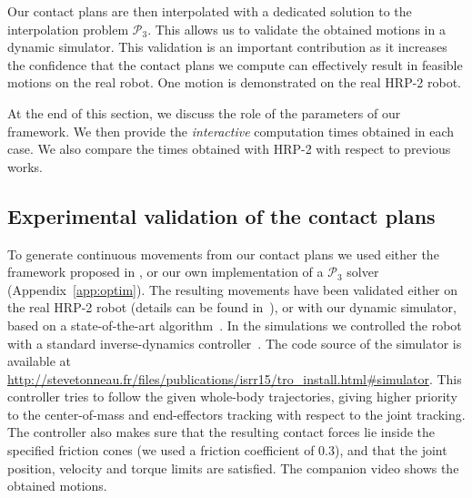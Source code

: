 \documentclass[journal]{IEEEtran}
\begin{document}
Our contact plans are then interpolated with a dedicated solution to the interpolation problem $\mathcal{P}_3$. This allows us to validate the obtained
motions in a dynamic simulator. This validation is an important contribution as it increases the confidence that the contact plans we compute can effectively
result in feasible motions on the real robot. One motion is demonstrated on the real HRP-2 robot.

At the end of this section, we discuss the role of the parameters of our framework. We then provide the \textit{interactive} computation times obtained in each case.
We also compare the times obtained with HRP-2 with respect to previous works.

\subsection{Experimental validation of the contact plans} \label{sec:valid}
To generate continuous movements from our contact plans we used either the framework proposed in \cite{Carpentier2016}, or our own implementation of a $\mathcal{P}_3$ solver (Appendix~\ref{app:optim}).
The resulting movements have been validated either on the real HRP-2 robot (details can be found in~\cite{Carpentier2016}), or with our dynamic simulator, based on a state-of-the-art algorithm~\cite{Kaufman2008}.
In the simulations we controlled the robot with a standard inverse-dynamics controller~\cite{DelPrete2015b}. The code source of the simulator is available at \url{http://stevetonneau.fr/files/publications/isrr15/tro_install.html\#simulator}.
This controller tries to follow the given whole-body trajectories, giving higher priority to the center-of-mass and end-effectors tracking with respect to the joint tracking.
The controller also makes sure that the resulting contact forces lie inside the specified friction cones (we used a friction coefficient of 0.3), and that the joint position, velocity and torque limits are satisfied.
The companion video shows the obtained motions.

\end{document}
